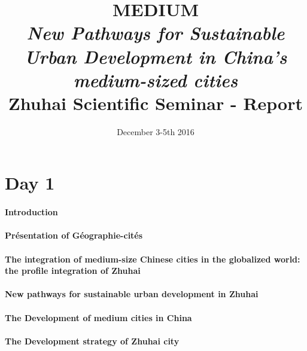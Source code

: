 




\title{MEDIUM\\\medskip
\textit{New Pathways for Sustainable Urban Development in China’s medium-sized cities}\\\medskip
Zhuhai Scientific Seminar - Report}
\author{}
\date{December 3-5th 2016}


\maketitle

\justify


\begin{abstract}
\end{abstract}






\section*{Day 1}


\paragraph{Introduction}


\paragraph{Pr{\'e}sentation of G{\'e}ographie-cit{\'e}s}


\paragraph{The integration of medium-size Chinese cities in the globalized world: the profile integration of Zhuhai}



\paragraph{New pathways for sustainable urban development in Zhuhai}



\paragraph{The Development of medium cities in China}




\paragraph{The Development strategy of Zhuhai city}



